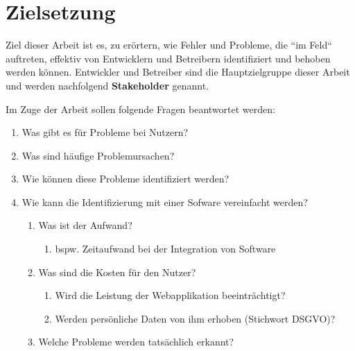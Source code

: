 \section{Zielsetzung}

Ziel dieser Arbeit ist es, zu erörtern, wie Fehler und Probleme, die ``im Feld`` auftreten, effektiv von Entwicklern und Betreibern identifiziert und behoben werden können. Entwickler und Betreiber sind die Hauptzielgruppe dieser Arbeit und werden nachfolgend \textbf{Stakeholder} genannt.

Im Zuge der Arbeit sollen folgende Fragen beantwortet werden:

\begin{enumerate}
	\item Was gibt es für Probleme bei Nutzern?
	\item Was sind häufige Problemursachen?
	\item Wie können diese Probleme identifiziert werden?
	\item Wie kann die Identifizierung mit einer Sofware vereinfacht werden?
	\begin{enumerate}
		\item Was ist der Aufwand?
		\begin{enumerate}
			\item bspw. Zeitaufwand bei der Integration von Software
		\end{enumerate}
		\item Was sind die Kosten für den Nutzer?
		\begin{enumerate}
			\item Wird die Leistung der Webapplikation beeinträchtigt?
			\item Werden persönliche Daten von ihm erhoben (Stichwort DSGVO)?
		\end{enumerate}
		\item Welche Probleme werden tatsächlich erkannt?
	\end{enumerate}
\end{enumerate}

